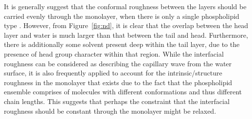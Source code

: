 It is generally suggest that the conformal roughness between the layers should be carried evenly through the monolayer, when there is only a single phospholipid type \cite{campbell_structure_2018}.
However, from Figure~\ref{fig:nd}, it is clear that the overlap between the head layer and water is much larger than that between the tail and head.
Furthermore, there is additionally some solvent present deep within the tail layer, due to the presence of head group character within that region.
While the interfacial roughness can be considered as describing the capillary wave from the water surface, it is also frequently applied to account for the intrinsic/structure roughness in the monolayer that exists due to the fact that the phospholipid ensemble comprises of molecules with different conformations and thus different chain lengths.
This suggests that perhaps the constraint that the interfacial roughness should be constant through the monolayer might be relaxed.
